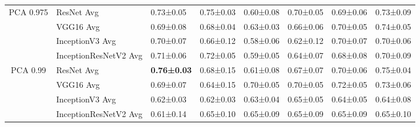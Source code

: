\begin{landscape}
\begin{table}[]
\begin{tabular}{clllllll}
\multirow{-4}{*}{PCA 0.975} & ResNet Avg                         & 0.73±0.05                                  & 0.75±0.03                         & 0.60±0.08                         & 0.70±0.05                         & 0.69±0.06                         & 0.73±0.09                         \\
                            & VGG16 Avg                          & 0.69±0.08                                  & 0.68±0.04                         & 0.63±0.03                         & 0.66±0.06                         & 0.70±0.05                         & 0.74±0.05                         \\
                            & InceptionV3 Avg                    & 0.70±0.07                                  & 0.66±0.12                         & 0.58±0.06                         & 0.62±0.12                         & 0.70±0.07                         & 0.70±0.06                         \\
                            & InceptionResNetV2 Avg              & 0.71±0.06                                  & 0.72±0.05                         & 0.59±0.05                         & 0.64±0.07                         & 0.68±0.08                         & 0.70±0.09                         \\
\multirow{-4}{*}{PCA 0.99}  & \cellcolor[HTML]{E7E6E6}ResNet Avg & \cellcolor[HTML]{E7E6E6}\textbf{0.76±0.03} & \cellcolor[HTML]{E7E6E6}0.68±0.15 & \cellcolor[HTML]{E7E6E6}0.61±0.08 & \cellcolor[HTML]{E7E6E6}0.67±0.07 & \cellcolor[HTML]{E7E6E6}0.70±0.06 & \cellcolor[HTML]{E7E6E6}0.75±0.04 \\
                            & VGG16 Avg                          & 0.69±0.07                                  & 0.64±0.15                         & 0.70±0.05                         & 0.70±0.05                         & 0.72±0.05                         & 0.73±0.06                         \\
                            & InceptionV3 Avg                    & 0.62±0.03                                  & 0.62±0.03                         & 0.63±0.04                         & 0.65±0.05                         & 0.64±0.05                         & 0.64±0.08                         \\
                            & InceptionResNetV2 Avg              & 0.61±0.14                                  & 0.65±0.10                         & 0.65±0.09                         & 0.65±0.09                         & 0.65±0.09                         & 0.65±0.10                         \\

\end{tabular}
\end{table}
\end{landscape}

